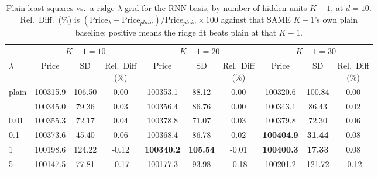 \begin{table}

\caption{\label{tab:rnn_ridge_lambda_d10}Plain least squares vs.\ a ridge $\lambda$ grid for the RNN basis, by number of hidden units $K-1$, at $d=10$. Rel.\ Diff.\ (\%) is $(\text{Price}_\lambda - \text{Price}_{plain})/\text{Price}_{plain} \times 100$ against that SAME $K-1$'s own plain baseline: positive means the ridge fit beats plain at that $K-1$.}
\footnotesize
\setlength{\tabcolsep}{3pt}
\centering
\begin{tabular}[t]{lccccccccc}
\toprule
\multicolumn{1}{c}{ } & \multicolumn{3}{c}{$K-1 = 10$} & \multicolumn{3}{c}{$K-1 = 20$} & \multicolumn{3}{c}{$K-1 = 30$} \\
\cmidrule(l{3pt}r{3pt}){2-4} \cmidrule(l{3pt}r{3pt}){5-7} \cmidrule(l{3pt}r{3pt}){8-10}
$\lambda$ & Price & SD & \shortstack{Rel.\ Diff\\(\%)} & Price & SD & \shortstack{Rel.\ Diff\\(\%)} & Price & SD & \shortstack{Rel.\ Diff\\(\%)}\\
\midrule
plain & 100315.9 & 106.50 & 0.00 & 100353.1 & 88.12 & 0.00 & 100320.6 & 100.84 & 0.00\\
\addlinespace
0.001 & 100345.0 & 79.36 & 0.03 & 100356.4 & 86.76 & 0.00 & 100343.1 & 86.43 & 0.02\\
0.01 & 100355.3 & 72.17 & 0.04 & 100378.8 & 71.07 & 0.03 & 100379.8 & 72.30 & 0.06\\
0.1 & 100373.6 & 45.40 & 0.06 & 100368.4 & 86.78 & 0.02 & \textbf{100404.9} & \textbf{31.44} & 0.08\\
1 & 100198.6 & 124.22 & -0.12 & \textbf{100340.2} & \textbf{105.54} & -0.01 & \textbf{100400.3} & \textbf{17.33} & 0.08\\
5 & 100147.5 & 77.81 & -0.17 & 100177.3 & 93.98 & -0.18 & 100201.2 & 121.72 & -0.12\\
\bottomrule
\end{tabular}

\vspace{1em}


\end{table}

